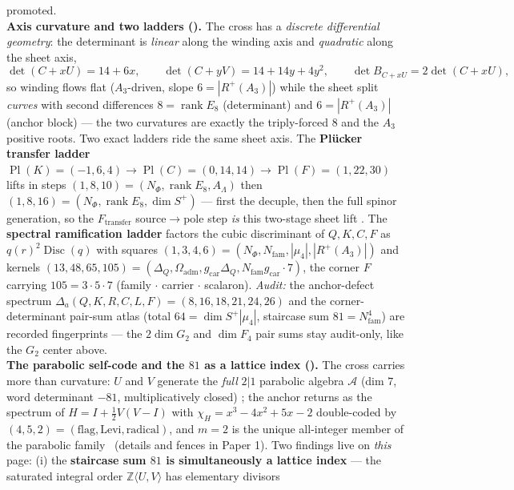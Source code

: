 \documentclass[11pt,a4paper]{article}
\newcommand{\gcar}{g_{\mathrm{car}}}
\newcommand{\Nfam}{N_{\mathrm{fam}}}
\newcommand{\Z}{\mathbb{Z}}
\theoremstyle{definition}
\begin{document}
\begin{winbox}
promoted.
\smallskip\\
\noindent\textbf{Axis curvature and two ladders ().} The cross has a
\emph{discrete differential geometry}: the determinant is \emph{linear} along the winding axis and
\emph{quadratic} along the sheet axis,
\[
  \det(C{+}xU)=14+6x,\qquad \det(C{+}yV)=14+14y+4y^2,\qquad \det B_{C+xU}=2\det(C{+}xU),
\]
so winding flows flat ($A_3$-driven, slope $6=|R^+(A_3)|$) while the sheet split \emph{curves} with second
differences $8=\operatorname{rank}E_8$ (determinant) and $6=|R^+(A_3)|$ (anchor block) --- the two curvatures
are exactly the triply-forced $8$ and the $A_3$ positive roots. Two exact ladders ride the same sheet axis.
The \textbf{Pl\"ucker transfer ladder} $\operatorname{Pl}(K)=({-}1,6,4)\to\operatorname{Pl}(C)=(0,14,14)\to
\operatorname{Pl}(F)=(1,22,30)$ lifts in steps $(1,8,10)=(N_\Phi,\operatorname{rank}E_8,A_\Lambda)$ then
$(1,8,16)=(N_\Phi,\operatorname{rank}E_8,\dim S^+)$ --- first the decuple, then the full spinor generation, so
the $F_{\mathrm{transfer}}$ source$\to$pole step \emph{is} this two-stage sheet lift \mC. The \textbf{spectral
ramification ladder} factors the cubic discriminant of $Q,K,C,F$ as $q(r)^2\operatorname{Disc}(q)$ with squares
$(1,3,4,6)=(N_\Phi,\Nfam,|\mu_4|,|R^+(A_3)|)$ and kernels $(13,48,65,105)=(\Delta_Q,\Omega_{\mathrm{adm}},
\gcar\Delta_Q,\Nfam\gcar\cdot7)$, the corner $F$ carrying $105=3{\cdot}5{\cdot}7$ (family $\cdot$ carrier
$\cdot$ scalaron). \emph{Audit:} the anchor-defect spectrum $\Delta_a(Q,K,R,C,L,F)=(8,16,18,21,24,26)$ and the
corner-determinant pair-sum atlas (total $64=\dim S^+|\mu_4|$, staircase sum $81=\Nfam^4$) are recorded
fingerprints --- the $2\dim G_2$ and $\dim F_4$ pair sums stay audit-only, like the $G_2$ center above.
\smallskip\\
\noindent\textbf{The parabolic self-code and the $81$ as a lattice index
().} The cross carries more than curvature: $U$ and $V$
generate the \emph{full} $2|1$ parabolic algebra $\mathcal A$ (dim $7$, word determinant $-81$,
multiplicatively closed) \mE; the anchor returns as the spectrum of $H=I+\tfrac12V(V-I)$ with
$\chi_H=x^3-4x^2+5x-2$ double-coded by $(4,5,2)=(\text{flag},\text{Levi},\text{radical})$, and $m=2$
is the unique all-integer member of the parabolic family \mE\ (details and fences in Paper 1).  Two
findings live on \emph{this} page: (i) the \textbf{staircase sum $81$ is simultaneously a lattice
index} --- the saturated integral order $\Z\langle U,V\rangle$ has elementary divisors

\end{winbox}
\end{document}
